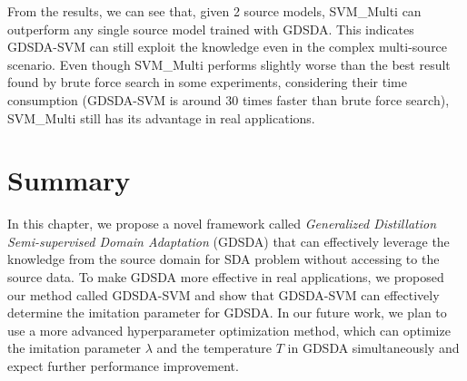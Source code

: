 From the results, we can see that, given 2 source models, SVM\_Multi can outperform any single source model trained with GDSDA. This indicates GDSDA-SVM can still exploit the knowledge even in the complex multi-source scenario. Even though SVM\_Multi performs slightly worse than the best result found by brute force search in some experiments, considering their time consumption (GDSDA-SVM is around 30 times faster than brute force search), SVM\_Multi still has its advantage in real applications.

\section{Summary}\label{sec:aaai:con}
In this chapter, we propose a novel framework called \textit{Generalized Distillation Semi-supervised Domain Adaptation} (GDSDA) that can effectively leverage the knowledge from the source domain for SDA problem without accessing to the source data. 
To make GDSDA more effective in real applications, we proposed our method called GDSDA-SVM and show that GDSDA-SVM can effectively determine the imitation parameter for GDSDA. 
In our future work, we plan to use a more advanced hyperparameter optimization method, which can optimize the imitation parameter $\lambda$ and the temperature $T$ in GDSDA simultaneously and expect
further performance improvement. 